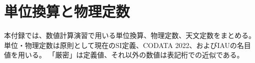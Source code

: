 \begingroup
\titlespacing*{\chapter}{0pt}{0pt}{6pt}
\titlespacing*{\section}{0pt}{0.62em}{0.20em}
\small
\linespread{1.0}\selectfont
\setlength{\parskip}{0pt}
\setlength{\tabcolsep}{1.5pt}
\renewcommand{\arraystretch}{1.00}
\setlength{\LTpre}{3pt}
\setlength{\LTpost}{3pt}
\chapter{単位換算と物理定数}\label{app:units-constants}

本付録では、数値計算演習で用いる単位換算、物理定数、天文定数をまとめる。
単位・物理定数は原則として現在のSI定義、CODATA 2022、およびIAUの名目値を用いる。
「厳密」は定義値、それ以外の数値は表記桁での近似である。


